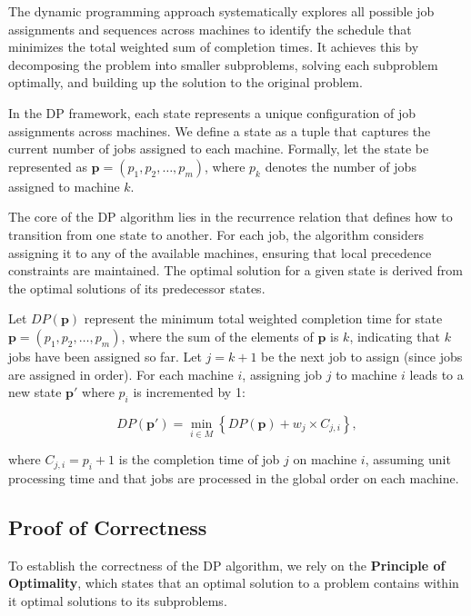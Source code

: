 The dynamic programming approach systematically explores all possible job assignments and sequences across machines to identify the schedule that minimizes the total weighted sum of completion times. It achieves this by decomposing the problem into smaller subproblems, solving each subproblem optimally, and building up the solution to the original problem.

In the DP framework, each state represents a unique configuration of job assignments across machines. We define a state as a tuple that captures the current number of jobs assigned to each machine. Formally, let the state be represented as $\boldsymbol{p} = (p_1, p_2, \dots, p_m)$, where $p_k$ denotes the number of jobs assigned to machine $k$.

The core of the DP algorithm lies in the recurrence relation that defines how to transition from one state to another. For each job, the algorithm considers assigning it to any of the available machines, ensuring that local precedence constraints are maintained. The optimal solution for a given state is derived from the optimal solutions of its predecessor states.

Let $DP(\boldsymbol{p})$ represent the minimum total weighted completion time for state $\boldsymbol{p} = (p_1, p_2, \dots, p_m)$, where the sum of the elements of $\boldsymbol{p}$ is $k$, indicating that $k$ jobs have been assigned so far. Let $j = k + 1$ be the next job to assign (since jobs are assigned in order). For each machine $i$, assigning job $j$ to machine $i$ leads to a new state $\boldsymbol{p}'$ where $p_i$ is incremented by 1:

\begin{equation}
    DP(\boldsymbol{p}') = \min_{i \in M} \left\{ DP(\boldsymbol{p}) + w_j \times C_{j,i} \right\},
    \label{eq:dp_recurrence}
\end{equation}

where $C_{j,i} = p_i + 1$ is the completion time of job $j$ on machine $i$, assuming unit processing time and that jobs are processed in the global order on each machine.

\subsection*{Proof of Correctness}

To establish the correctness of the DP algorithm, we rely on the \textbf{Principle of Optimality}, which states that an optimal solution to a problem contains within it optimal solutions to its subproblems.

